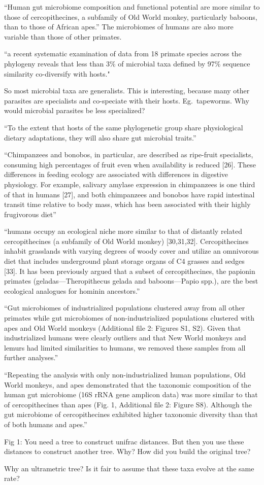 \documentclass{article}
\begin{document}
``Human gut microbiome composition and functional potential are more
similar to those of cercopithecines, a subfamily of Old World monkey,
particularly baboons, than to those of African apes.'' The microbiomes
of humans are also more variable than those of other primates.

``a recent systematic examination of data from 18 primate species
across the phylogeny reveals that less than 3\% of microbial taxa
defined by 97\% sequence similarity co-diversify with hosts."

So most microbial taxa are generalists. This is interesting, because
many other parasites are specialists and co-speciate with their
hosts. Eg.~tapeworms. Why would microbial parasites be less
specialized?

``To the extent that hosts of the same phylogenetic group share
physiological dietary adaptations, they will also share gut microbial
traits.''

``Chimpanzees and bonobos, in particular, are described as ripe-fruit
specialists, consuming high percentages of fruit even when
availability is reduced [26]. These differences in feeding ecology are
associated with differences in digestive physiology. For example,
salivary amylase expression in chimpanzees is one third of that in
humans [27], and both chimpanzees and bonobos have rapid intestinal
transit time relative to body mass, which has been associated with
their highly frugivorous diet''

``humans occupy an ecological niche more similar to that of distantly
related cercopithecines (a subfamily of Old World monkey)
[30,31,32]. Cercopithecines inhabit grasslands with varying degrees of
woody cover and utilize an omnivorous diet that includes underground
plant storage organs of C4 grasses and sedges [33]. It has been
previously argued that a subset of cercopithecines, the papionin
primates (geladas---Theropithecus gelada and baboons---Papio spp.),
are the best ecological analogues for hominin ancestors.''

``Gut microbiomes of industrialized populations clustered away from
all other primates while gut microbiomes of non-industrialized
populations clustered with apes and Old World monkeys (Additional file
2: Figures S1, S2). Given that industrialized humans were clearly
outliers and that New World monkeys and lemurs had limited
similarities to humans, we removed these samples from all further
analyses.''

``Repeating the analysis with only non-industrialized human
populations, Old World monkeys, and apes demonstrated that the
taxonomic composition of the human gut microbiome (16S rRNA gene
amplicon data) was more similar to that of cercopithecines than apes
(Fig. 1, Additional file 2: Figure S8). Although the gut microbiome of
cercopithecines exhibited higher taxonomic diversity than that of both
humans and apes.''

Fig 1: You need a tree to construct unifrac distances. But then you
use these distances to construct another tree. Why? How did you build
the original tree?

Why an ultrametric tree? Is it fair to assume that these taxa evolve
at the same rate?
\end{document}

